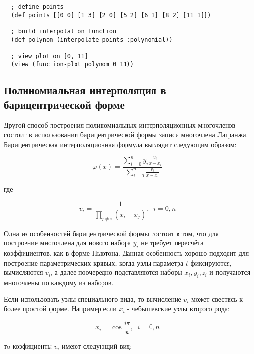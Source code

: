 \begin{verbatim}
  ; define points
  (def points [[0 0] [1 3] [2 0] [5 2] [6 1] [8 2] [11 1]])

  ; build interpolation function
  (def polynom (interpolate points :polynomial))

  ; view plot on [0, 11]
  (view (function-plot polynom 0 11))
\end{verbatim}




\subsection{Полиномиальная интерполяция в барицентрической форме}

Другой способ построения полиномиальных интерполяционных многочленов состоит в использовании барицентрической формы записи многочлена Лагранжа. Барицентрическая интерполяционная формула выглядит следующим образом:

\begin{equation}
  \varphi(x) = \frac
  {\sum\limits_{i=0}^n y_i \frac{v_i}{x - x_i}}
  {\sum\limits_{i=0}^n \frac{v_i}{x - x_i}}
\end{equation}

\noindent где

\begin{equation}
  v_i = \frac{1}{\prod_{j \neq i}(x_i - x_j)}, \;\; i = \overline{0,n}
\end{equation}

Одна из особенностей барицентрической формы состоит в том, что для построение многочлена для нового набора ${y_i}$ не требует пересчёта коэффициентов, как в форме Ньютона. Данная особенность хорошо подходит для построение параметрических кривых, когда узлы параметра $t$ фиксируются, вычисляются $v_i$, а далее поочередно подставляются наборы ${x_i}, {y_i}, {z_i}$ и получаются многочлены по каждому из наборов.

Если использовать узлы специального вида, то вычисление $v_i$ может свестись к более простой форме. Например если $x_i$ - чебышевские узлы второго рода:

\begin{equation}
  x_i = \cos \frac{i \pi}{n}, \;\; i = \overline{0, n}
\end{equation}

\noindent тo коэфициенты $v_i$ имеют следующий вид:

